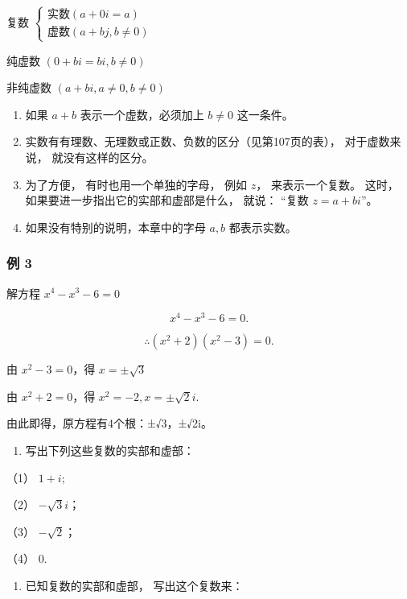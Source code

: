 复数
\(\left\{\begin{array}{l} \text{实数}(a+0i=a) \\ \text{虚数}(a+bj,b\neq0)\end{array}\right.\)

纯虚数 \((0 + bi = bi, b \neq 0)\)

非纯虚数 \((a + bi, a \neq 0, b \neq 0)\)


\begin{enumerate}
\item
  如果 \(a + b\) 表示一个虚数，必须加上 \(b \neq 0\) 这一条件。
\item
  实数有有理数、无理数或正数、负数的区分（见第107页的表），
  对于虚数来说， 就没有这样的区分。
\item
  为了方便， 有时也用一个单独的字母， 例如 \(z\)， 来表示一个复数。
  这时， 如果要进一步指出它的实部和虚部是什么， 就说： ``复数
  \(z = a + b i\)''。
\item
  如果没有特别的说明，本章中的字母 \(a, b\) 都表示实数。
\end{enumerate}

\subsubsection{例 3}


解方程 \(x^{4} - x^{3} - 6 = 0\)

\[
x ^ {4} - x ^ {3} - 6 = 0.
\]

\[
\therefore (x ^ {2} + 2) (x ^ {2} - 3) = 0.
\]

由 \(x^{2} - 3 = 0\)，得 \(x = \pm \sqrt{3}\)

由 \(x^{2} + 2 = 0\)，得 \(x^{2} = -2, x = \pm \sqrt{2} i.\)

由此即得，原方程有4个根：±√3，±√2i。

\begin{enumerate}
\item
  写出下列这些复数的实部和虚部：
\end{enumerate}

（1） \(1 + i;\)

（2） \(-\sqrt{3}i\)；

（3） \(-\sqrt{2}\)；

（4） 0.

\begin{enumerate}[start=2]
\item
  已知复数的实部和虚部， 写出这个复数来：
\end{enumerate}

